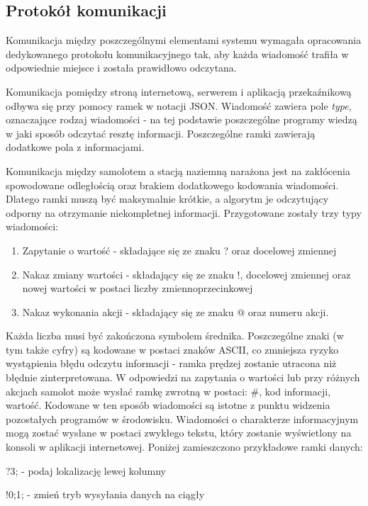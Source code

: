 \documentclass[12pt, a4paper]{article}
\begin{document}
\FloatBarrier
\subsection{Protokół komunikacji}
Komunikacja między poszczególnymi elementami systemu wymagała opracowania dedykowanego protokołu komunikacyjnego tak, aby każda wiadomość trafiła w odpowiednie miejsce i została prawidłowo odczytana. 

Komunikacja pomiędzy stroną internetową, serwerem i aplikacją przekaźnikową odbywa się przy pomocy ramek w notacji JSON. Wiadomość zawiera pole \textit{type}, oznaczające rodzaj wiadomości - na tej podstawie poszczególne programy wiedzą w jaki sposób odczytać resztę informacji. Poszczególne ramki zawierają dodatkowe pola z informacjami. 

Komunikacja między samolotem a stacją naziemną narażona jest na zakłócenia spowodowane odległością oraz brakiem dodatkowego kodowania wiadomości. Dlatego ramki muszą być maksymalnie krótkie, a algorytm je odczytujący odporny na otrzymanie niekompletnej informacji. Przygotowane zostały trzy typy wiadomości:

\begin{enumerate}
	\item Zapytanie o wartość - składające się ze znaku ? oraz docelowej zmiennej
	\item Nakaz zmiany wartości - składający się ze znaku !, docelowej zmiennej oraz nowej wartości w postaci liczby zmiennoprzecinkowej
	\item Nakaz wykonania akcji - składający się ze znaku @ oraz numeru akcji.	
\end{enumerate}

Każda liczba musi być zakończona symbolem średnika. Poszczególne znaki (w tym także cyfry) są kodowane w postaci znaków ASCII, co zmniejsza ryzyko wystąpienia błędu odczytu informacji - ramka prędzej zostanie utracona niż błędnie zinterpretowana. W odpowiedzi na zapytania o wartości lub przy różnych akcjach samolot może wysłać ramkę zwrotną w postaci: \#, kod informacji, wartość. Kodowane w ten sposób wiadomości są istotne z punktu widzenia pozostałych programów w środowisku. Wiadomości o charakterze informacyjnym mogą zostać wysłane w postaci zwykłego tekstu, który zostanie wyświetlony na konsoli w aplikacji internetowej. Poniżej zamieszczono przykładowe ramki danych: 

?3; - podaj lokalizację lewej kolumny

!0;1; - zmień tryb wysyłania danych na ciągły
\end{document}
